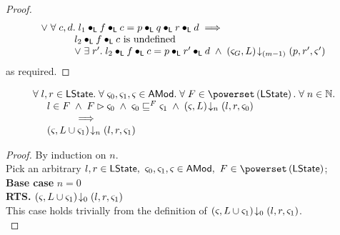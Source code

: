 \begin{lemma}
\begin{proof}
\[\begin{array}{l}
	\lor\;\forall\; c, d.\;  l_1 \bullet_{\textsf{L}} f \bullet_{\textsf{L}} c = p \bullet_{\textsf{L}} q \bullet_{\textsf{L}} r \bullet_{\textsf{L}} d \implies\\
	\hspace*{1cm}
	\begin{array}{l l}
		l_2 \bullet_{\textsf{L}} f \bullet_{\textsf{L}} c \text{ is undefined}\\
		\lor\; \exists\; r'.\; l_2 \bullet_{\textsf{L}} f \bullet_{\textsf{L}} c = p \bullet_{\textsf{L}}  r' \bullet_{\textsf{L}} d \;\land\; \left(\varsigma_{G}, L\right) \!\downarrow_{(m-1)} \left(p, r', \varsigma_{}'\right)
	\end{array}
\end{array}
\]
%
as required.
\end{proof}
\end{lemma}
%
%
\begin{lemma}[] \label{lem:amodHiding}
%
\[
\begin{array}{l}
	\for{l, r \in \LState} \for{\amod{0}, \amod{1}, \amod{} \in \AMods} \for{ F \in \pset{\LState}} \for{n \in \Nats} \\
	
	\hspace*{0.5cm} 
	l \in F \;\land\; 
	F \fences \amod{0} \;\land\; 
	\amod{0} \weakenI{F} \amod{1}\;\land\;
	\extendsAMUpto{\amod{}, L}{n}{l}{r}{\amod{0}}\\
	
	\hspace*{1.5cm} \implies\\
	
	
	\hspace*{0.5cm}
	\extendsAMUpto{\amod{}, L \cup \amod{1}}{n}{l}{r}{\amod{1}}\\
\end{array}
\]
%
\begin{proof}
By induction on $n$. \\
Pick an arbitrary $l, r \in \LState,\ \amod{0}, \amod{1}, \amod{} \in \AMods,\  F \in \pset{\LState}$;\\
\noindent\textbf{Base case} $n = 0$\\
\textbf{RTS. } $\left(\varsigma_{}, L \cup \varsigma_{1}\right) \!\downarrow_{0} \left(l, r, \varsigma_{1}\right)$\\
This case holds trivially from the definition of $\left(\varsigma_{}, L \cup \varsigma_{1}\right) \!\downarrow_{0} \left(l, r, \varsigma_{1}\right)$.\\


\end{proof}
\end{lemma}
